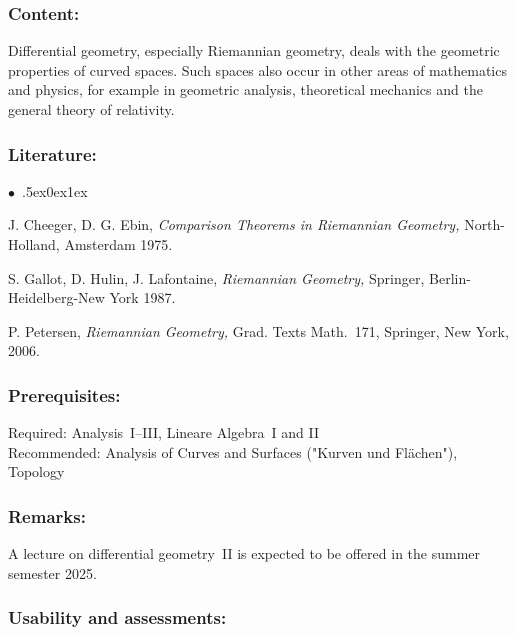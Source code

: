 \documentclass[a4paper,10pt]{article}
\renewenvironment{itemize}{\begin{list}{$\bullet$\ }{\itemsep.5ex\setlength{\topsep}{0.5\itemsep}\parsep0ex\labelsep1ex\settowidth{\labelwidth}{$\bullet$\ }\setlength{\leftmargin}{\labelwidth}\addtolength{\leftmargin}{3ex}\addtolength{\leftmargin}{\labelsep}}}{\end{list}}
\begin{document}
\subsubsection*{\large
    Content:
}
Differential geometry, especially Riemannian geometry, deals with the geometric properties of curved spaces.
Such spaces also occur in other areas of mathematics and physics, for example in geometric analysis, theoretical mechanics and the general theory of relativity.
\subsubsection*{\large
    Literature:
}
\begin{itemize}
\item{J. Cheeger, D. G. Ebin, {\em Comparison Theorems in Riemannian Geometry,\/} North-Holland, Amsterdam 1975.}
\item{S. Gallot, D. Hulin, J. Lafontaine, {\em Riemannian Geometry,\/} Springer, Berlin-Heidelberg-New York 1987.}
\item{P. Petersen, {\em Riemannian Geometry,\/} Grad. Texts Math.~171, Springer, New York, 2006.}
\end{itemize}
\subsubsection*{\large
    Prerequisites:
}
Required: Analysis~I–III, Lineare Algebra~I and II \\
Recommended: Analysis of Curves and Surfaces ("Kurven und Flächen"), Topology
\subsubsection*{\large
    Remarks:
}
A lecture on differential geometry~II is expected to be offered in the summer semester 2025.
\cleardoublepage
\subsubsection*{\large
    Usability and assessments:
}
\end{document}
